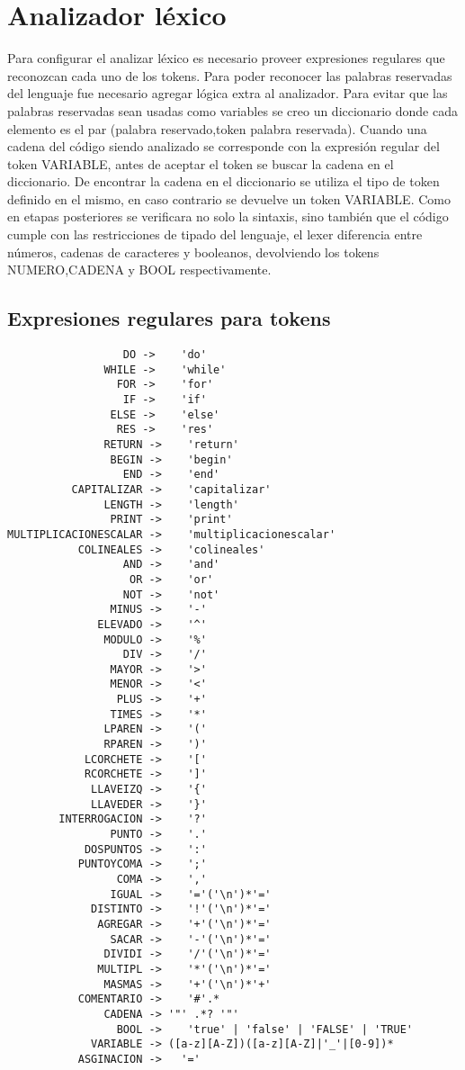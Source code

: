 \section{Analizador léxico }

Para configurar el analizar léxico es necesario proveer expresiones regulares que reconozcan cada uno de los tokens. Para poder reconocer las palabras reservadas del lenguaje  fue necesario agregar lógica extra al analizador. Para evitar que las palabras reservadas sean usadas como variables se creo un diccionario donde cada elemento es el par (palabra reservado,token palabra reservada). Cuando una cadena del código siendo analizado se corresponde con la expresión regular del token VARIABLE, antes de aceptar el token se buscar la cadena en el diccionario. De encontrar la cadena en el diccionario se utiliza el tipo de token definido en el mismo, en caso contrario se devuelve un token VARIABLE. 
Como en etapas posteriores se verificara no solo la sintaxis, sino también que el código cumple con las restricciones de tipado del lenguaje, el lexer diferencia entre números, cadenas de caracteres y booleanos, devolviendo los tokens NUMERO,CADENA y BOOL respectivamente.

\subsection{Expresiones regulares para tokens}

\begin{verbatim}
                  DO ->    'do'
               WHILE ->    'while'
                 FOR ->    'for'
                  IF ->    'if'
                ELSE ->    'else'
                 RES ->    'res'
               RETURN ->    'return'
                BEGIN ->    'begin'
                  END ->    'end'
          CAPITALIZAR ->    'capitalizar'
               LENGTH ->    'length'
                PRINT ->    'print'
MULTIPLICACIONESCALAR ->    'multiplicacionescalar'
           COLINEALES ->    'colineales'
                  AND ->    'and'
                   OR ->    'or'
                  NOT ->    'not'
                MINUS ->    '-'
              ELEVADO ->    '^'
               MODULO ->    '%'
                  DIV ->    '/'
                MAYOR ->    '>'
                MENOR ->    '<'
                 PLUS ->    '+'
                TIMES ->    '*'
               LPAREN ->    '('
               RPAREN ->    ')'
            LCORCHETE ->    '['
            RCORCHETE ->    ']'
             LLAVEIZQ ->    '{'
             LLAVEDER ->    '}'
        INTERROGACION ->    '?'
                PUNTO ->    '.'
            DOSPUNTOS ->    ':'
           PUNTOYCOMA ->    ';'
                 COMA ->    ','
                IGUAL ->    '='('\n')*'='
             DISTINTO ->    '!'('\n')*'='
              AGREGAR ->    '+'('\n')*'='
                SACAR ->    '-'('\n')*'='
               DIVIDI ->    '/'('\n')*'='
              MULTIPL ->    '*'('\n')*'='
               MASMAS ->    '+'('\n')*'+'
           COMENTARIO ->    '#'.*
               CADENA -> '"' .*? '"'
                 BOOL ->    'true' | 'false' | 'FALSE' | 'TRUE'
             VARIABLE -> ([a-z][A-Z])([a-z][A-Z]|'_'|[0-9])*
           ASGINACION ->   '='

\end{verbatim}
